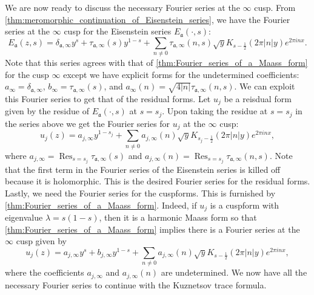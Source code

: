\documentclass[12pt]{book}
\theoremstyle{definition}\newframedtheorem{method}{Method}
\newcommand{\mf}{\mathfrak}
\renewcommand{\d}{\delta}
\renewcommand{\l}{\lambda}
\newcommand{\<}{\langle}
\renewcommand{\>}{\rangle}
\DeclareMathOperator*{\Res}{\mathrm{Res}}
\begin{document}
      We are now ready to discuss the necessary Fourier series at the $\infty$ cusp. From \cref{thm:meromorphic_continuation_of_Eisenstein_series}, we have the Fourier series at the $\infty$ cusp for the Eisenstein series $E_{\mf{a}}(\cdot,s)$:
      \[
        E_{\mf{a}}(z,s) = \d_{\mf{a},\infty}y^{s}+\tau_{\mf{a},\infty}(s)y^{1-s}+\sum_{n \neq 0}\tau_{\mf{a},\infty}(n,s)\sqrt{y}K_{s-\frac{1}{2}}(2\pi|n|y)e^{2\pi inx}.
      \]
      Note that this series agrees with that of \cref{thm:Fourier_series_of_a_Maass_form} for the cusp $\infty$ except we have explicit forms for the undetermined coefficients: $a_{\infty} = \d_{\mf{a},\infty}$, $b_{\infty} = \tau_{\mf{a},\infty}(s)$, and $a_{\infty}(n) = \sqrt{4|n|}\tau_{\mf{a},\infty}(n,s)$. We can exploit this Fourier series to get that of the residual forms. Let $u_{j}$ be a reisdual form given by the residue of $E_{\mf{a}}(\cdot,s)$ at $s = s_{j}$. Upon taking the residue at $s = s_{j}$ in the series above we get the Fourier series for $u_{j}$ at the $\infty$ cusp:
      \[
        u_{j}(z) = a_{j,\infty}y^{1-s_{j}}+\sum_{n \neq 0}a_{j,\infty}(n)\sqrt{y}K_{s_{j}-\frac{1}{2}}(2\pi|n|y)e^{2\pi inx},
      \]
      where $a_{j,\infty} = \Res_{s = s_{j}}\tau_{\mf{a},\infty}(s)$ and $a_{j,\infty}(n) = \Res_{s = s_{j}}\tau_{\mf{a},\infty}(n,s)$. Note that the first term in the Fourier series of the Eisenstein series is killed off because it is holomorphic. This is the desired Fourier series for the residual forms. Lastly, we need the Fourier series for the cuspforms. This is furnished by \cref{thm:Fourier_series_of_a_Maass_form}. Indeed, if $u_{j}$ is a cuspform with eigenvalue $\l = s(1-s)$, then it is a harmonic Maass form so that \cref{thm:Fourier_series_of_a_Maass_form} implies there is a Fourier series at the $\infty$ cusp given by
      \[
        u_{j}(z) = a_{j,\infty}y^{s}+b_{j,\infty}y^{1-s}+\sum_{n \neq 0}a_{j,\infty}(n)\sqrt{y}K_{s-\frac{1}{2}}(2\pi|n|y)e^{2\pi inx},
      \]
      where the coefficients $a_{j,\infty}$ and $a_{j,\infty}(n)$ are undetermined. We now have all the necessary Fourier series to continue with the Kuznetsov trace formula.
\end{document}
